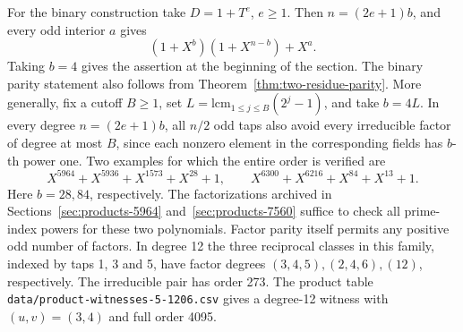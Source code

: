 \documentclass[11pt]{article}
\begin{document}
For the binary construction take \(D=1+T^e\), \(e\ge1\). Then
\(n=(2e+1)b\), and every odd interior \(a\) gives
\[
             (1+X^b)(1+X^{n-b})+X^a .
\]
Taking \(b=4\) gives the assertion at the beginning of the section.
The binary parity statement also follows from Theorem~\ref{thm:two-residue-parity}.
More generally, fix a cutoff \(B\ge1\), set
\(L=\mathrm{lcm}_{1\le j\le B}(2^j-1)\), and take \(b=4L\).
In every degree \(n=(2e+1)b\), all \(n/2\) odd taps also avoid every
irreducible factor of degree at most \(B\), since each nonzero element
in the corresponding fields has \(b\)-th power one.
Two examples for which the entire order is verified are
\[
 X^{5964}+X^{5936}+X^{1573}+X^{28}+1,\qquad
 X^{6300}+X^{6216}+X^{84}+X^{13}+1 .
\]
Here \(b=28,84\), respectively. The factorizations archived in
Sections~\ref{sec:products-5964} and~\ref{sec:products-7560} suffice
to check all prime-index powers for these two polynomials. Factor
parity itself permits any positive odd number of factors. In degree
12 the three reciprocal classes in this family, indexed by taps
1, 3 and 5, have factor degrees \((3,4,5),(2,4,6),(12)\), respectively.
The irreducible pair has order 273. The product table
\nolinkurl{data/product-witnesses-5-1206.csv} gives a degree-12
witness with \((u,v)=(3,4)\) and full order 4095.
\end{document}
